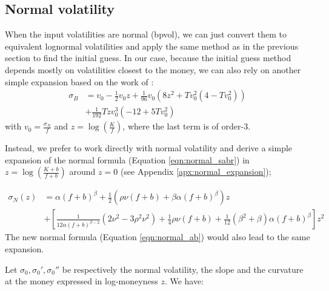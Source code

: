 \documentclass[]{rAMF2e}
\begin{document}
\subsection{Normal volatility}
When the input volatilities are normal (bpvol), we can just convert them to equivalent lognormal volatilities and apply the same method as in the previous section to find the initial guess. In our case, because the initial guess method depends mostly on volatilities closest to the money, we can also rely on another simple expansion based on the work of \citep{lorig2014implied}:
\begin{align}
\sigma_B &= v_0 - \frac{1}{2}v_0 z + \frac{1}{96}v_0(8z^2+T v_0^2 (4-T v_0^2)) \nonumber \\
         &+ \frac{1}{192}T z v_0^3 (-12+5T v_0^2)
\end{align}
with $v_0 = \frac{\sigma_N}{f}$ and $z=\log(\frac{K}{f})$, where the last term is of order-3.

Instead, we prefer to work directly with normal volatility and derive a simple expansion of the normal formula (Equation \ref{eqn:normal_sabr}) in $z=\log\left(\frac{K+b}{f+b}\right)$ around $z=0$ (see Appendix \ref{apx:normal_expansion});

\begin{align}
\sigma_N(z) &= \alpha (f+b)^\beta + \frac{1}{2}\left(\rho \nu (f+b)+\beta \alpha (f+b)^\beta \right)z\nonumber\\
&+ \left[\frac{1}{12\alpha (f+b)^{\beta-2}}(2\nu^2-3\rho^2 \nu^2)+\frac{1}{4} \rho \nu (f+b)+\frac{1}{12}(\beta^2+\beta)\alpha (f+b)^\beta \right]z^2
\end{align}
The new normal formula (Equation \ref{eqn:normal_ab}) would also lead to the same expansion.

Let $\sigma_0, \sigma_0', \sigma_0''$ be respectively the normal volatility, the slope and the curvature at the money expressed in log-moneyness $z$. We have:
\end{document}
